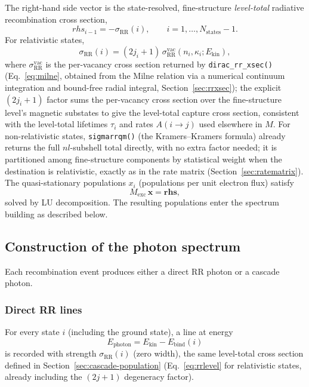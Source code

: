 \documentclass[11pt,a4paper]{article}
\renewcommand{\vec}[1]{\bm{#1}}
\begin{document}
The right-hand side vector is the state-resolved, fine-structure
\emph{level-total} radiative recombination cross section,
\[
\mathit{rhs}_{i-1} = -\sigma_{\mathrm{RR}}(i),\qquad i=1,\ldots,N_{\mathrm{states}}-1.
\]
For relativistic states,
\begin{equation}
  \sigma_{\mathrm{RR}}(i) = (2j_{i}+1)\,
    \sigma_{\mathrm{RR}}^{\mathrm{vac}}(n_{i},\kappa_{i}; E_{\mathrm{kin}}),
  \label{eq:rrlevel}
\end{equation}
where $\sigma_{\mathrm{RR}}^{\mathrm{vac}}$ is the per-vacancy cross
section returned by {\tt dirac\_rr\_xsec()} (Eq.~\ref{eq:milne}, obtained
from the Milne relation via a numerical continuum integration and
bound-free radial integral, Section~\ref{sec:rrxsec}); the explicit
$(2j_{i}+1)$ factor sums the per-vacancy cross section over the fine-structure
level's magnetic substates to give the level-total capture cross section,
consistent with the level-total lifetimes $\tau_{i}$ and rates $A(i\to j)$
used elsewhere in $M$. For non-relativistic states, {\tt sigmarrqm()}
(the Kramers--Kramers formula) already returns the full $nl$-subshell
total directly, with no extra factor needed; it is partitioned among
fine-structure components by statistical weight when the destination is
relativistic, exactly as in the rate matrix (Section~\ref{sec:ratematrix}).
The quasi-stationary populations $x_{i}$ (populations per unit electron flux)
satisfy
\[
M_{\mathrm{exc}}\,\vec{x} = \vec{rhs},
\]
solved by LU decomposition.  The resulting populations enter the spectrum
building as described below.

\subsection{Construction of the photon spectrum}

Each recombination event produces either a direct RR photon or a cascade
photon.

\subsubsection*{Direct RR lines}
For every state $i$ (including the ground state), a line at energy
\[
E_{\text{photon}} = E_{\text{kin}} - E_{\text{bind}}(i)
\]
is recorded with strength $\sigma_{\mathrm{RR}}(i)$ (zero width), the
same level-total cross section defined in
Section~\ref{sec:cascade-population} (Eq.~\ref{eq:rrlevel} for
relativistic states, already including the $(2j+1)$ degeneracy factor).
\end{document}
